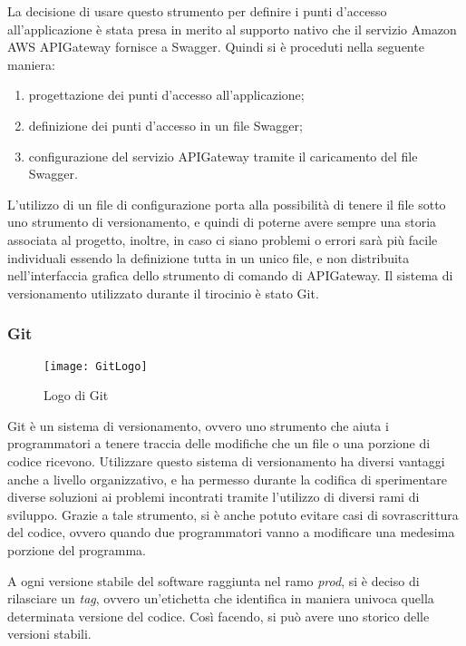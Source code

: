 La decisione di usare questo strumento per definire i punti d'accesso
all'applicazione è stata presa in merito al supporto nativo che il servizio
Amazon AWS APIGateway fornisce a Swagger. Quindi si è proceduti nella seguente
maniera:
\begin{enumerate}
  \item progettazione dei punti d'accesso all'applicazione;
  \item definizione dei punti d'accesso in un file Swagger;
  \item configurazione del servizio APIGateway tramite il caricamento del file
Swagger.
\end{enumerate}


L'utilizzo di un file di configurazione porta alla possibilità di
tenere il file sotto uno strumento di versionamento, e quindi di poterne avere
sempre una storia associata al progetto, inoltre, in caso ci siano problemi o
errori sarà più facile individuali essendo la definizione tutta in un unico
file, e non distribuita nell'interfaccia grafica dello strumento di comando di
APIGateway.
Il sistema di versionamento utilizzato durante il tirocinio è stato Git.

\newpage

\subsubsection{Git}
\begin{figure}[H]
  \centering
  \texttt{[image: GitLogo]}
  \caption{Logo di Git}
\end{figure}
Git è un sistema di versionamento, ovvero uno strumento che aiuta i
programmatori a tenere traccia delle modifiche che un file o una porzione di
codice ricevono. Utilizzare questo sistema di versionamento ha diversi vantaggi
anche a livello organizzativo, e ha permesso durante la codifica di
sperimentare diverse soluzioni ai problemi incontrati tramite l'utilizzo di
diversi rami di sviluppo. Grazie a tale strumento, si è anche potuto evitare
casi di sovrascrittura del codice, ovvero quando due programmatori vanno a
modificare una medesima porzione del programma.

A ogni versione stabile del software raggiunta nel ramo \textit{prod}, si è
deciso di rilasciare un \textit{tag}, ovvero un'etichetta che identifica in
maniera univoca quella determinata versione del codice. Così facendo, si può
avere uno storico delle versioni stabili.

